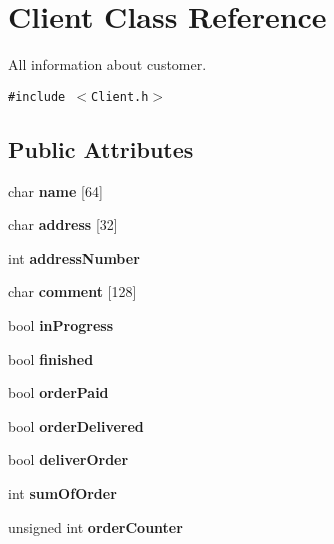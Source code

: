 \hypertarget{class_client}{
\section{Client Class Reference}
\label{class_client}
}
All information about customer.  


{\tt \#include $<$Client.h$>$}

\subsection*{Public Attributes}
\begin{CompactItemize}
\item 
\hypertarget{class_client_275f6727040426992bb1c8e247d38cde}{
char {\bf name} \mbox{[}64\mbox{]}}
\label{class_client_275f6727040426992bb1c8e247d38cde}

\item 
\hypertarget{class_client_06a8d016fa013b9fc60bcc24da937701}{
char {\bf address} \mbox{[}32\mbox{]}}
\label{class_client_06a8d016fa013b9fc60bcc24da937701}

\item 
\hypertarget{class_client_6ab3066cc6893cf6833b2871ecdebaf2}{
int {\bf address\-Number}}
\label{class_client_6ab3066cc6893cf6833b2871ecdebaf2}

\item 
\hypertarget{class_client_34824e2772f77c71f2d3778354d68b1c}{
char {\bf comment} \mbox{[}128\mbox{]}}
\label{class_client_34824e2772f77c71f2d3778354d68b1c}

\item 
\hypertarget{class_client_292db71ff1a82008b52bc6f74bd0419e}{
bool {\bf in\-Progress}}
\label{class_client_292db71ff1a82008b52bc6f74bd0419e}

\item 
\hypertarget{class_client_a5d7ceb2c59b8cee46c2953fec9abc19}{
bool {\bf finished}}
\label{class_client_a5d7ceb2c59b8cee46c2953fec9abc19}

\item 
\hypertarget{class_client_8498e9222401c9034d4e5a26970a3400}{
bool {\bf order\-Paid}}
\label{class_client_8498e9222401c9034d4e5a26970a3400}

\item 
\hypertarget{class_client_63c4891c26137238d3075aa6a395c235}{
bool {\bf order\-Delivered}}
\label{class_client_63c4891c26137238d3075aa6a395c235}

\item 
\hypertarget{class_client_48e3b11844a6747c24de0ff69018f775}{
bool {\bf deliver\-Order}}
\label{class_client_48e3b11844a6747c24de0ff69018f775}

\item 
\hypertarget{class_client_89b86d03136dc2f044d7669137baf6b5}{
int {\bf sum\-Of\-Order}}
\label{class_client_89b86d03136dc2f044d7669137baf6b5}

\item 
\hypertarget{class_client_25f95fa8cae78c29d5fe90cb9879944a}{
unsigned int {\bf order\-Counter}}
\label{class_client_25f95fa8cae78c29d5fe90cb9879944a}

\end{CompactItemize}
